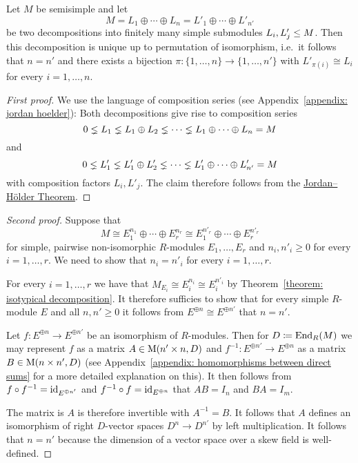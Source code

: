 \begin{lemma}
  \label{lemma: multiplicities for finite length}
  Let $M$ be semisimple and let
  \[
      M
    = L_1 \oplus \dotsb \oplus L_n
    = L'_1 \oplus \dotsb \oplus L'_{n'}
  \]
  be two decompositions into finitely many simple submodules $L_i, L'_j \leq M$.
  Then this decomposition is unique up to permutation of isomorphism, i.e.\ it follows that $n = n'$ and there exists a bijection $\pi \colon \{1, \dotsc, n\} \to \{1, \dotsc, n'\}$ with $L'_{\pi(i)} \cong L_i$ for every $i = 1, \dotsc, n$.
\end{lemma}


\begin{proof}[First proof]
  We use the language of composition series (see Appendix~\ref{appendix: jordan hoelder}):
  Both decompositions give rise to composition series
  \[
                0
    \lneq  L_1
    \lneq  L_1 \oplus L_2
    \lneq  \dotsb
    \lneq  L_1 \oplus \dotsb \oplus L_n
    =           M
  \]
  and
  \[
                0
    \lneq  L'_1
    \lneq  L'_1 \oplus L'_2
    \lneq  \dotsb
    \lneq  L'_1 \oplus \dotsb \oplus L'_{n'}
    =           M
  \]
  with composition factors $L_i, L'_j$.
  The claim therefore follows from the \hyperref[theorem: jordan hoelder theorem]{Jordan--Hölder Theorem}.
\end{proof}


\begin{proof}[Second proof]
  Suppose that
  \[
          M
    \cong E_1^{n_1} \oplus \dotsb \oplus E_r^{n_r}
    \cong E_1^{n'_r} \oplus \dotsb \oplus E_r^{n'_r}
  \]
  for simple, pairwise non-isomorphic $R$-modules $E_1, \dotsc, E_r$ and $n_i, n'_i \geq 0$ for every $i = 1, \dotsc, r$.
  We need to show that $n_i = n'_i$ for every $i = 1, \dotsc, r$.
  
  For every $i = 1, \dotsc, r$ we have that $M_{E_i} \cong E_i^{n_i} \cong E_i^{n'_i}$ by Theorem~\ref{theorem: isotypical decomposition}.
  It therefore sufficies to show that for every simple $R$-module $E$ and all $n, n' \geq 0$ it follows from $E^{\oplus n} \cong E^{\oplus n'}$ that $n = n'$.
  
  Let $f \colon E^{\oplus n} \to E^{\oplus n'}$ be an isomorphism of $R$-modules.
  Then for $D \coloneqq \operatorname{End}_R(M)$ we may represent $f$ as a matrix $A \in \operatorname{M}(n' \times n, D)$ and $f^{-1} \colon E^{\oplus n'} \to E^{\oplus n}$ as a matrix $B \in \operatorname{M}(n \times n', D)$ (see Appendix~\ref{appendix: homomorphisms between direct sums} for a more detailed explanation on this).
  It then follows from $f \circ f^{-1} = \operatorname{id}_{E^{\oplus n'}}$ and $f^{-1} \circ f = \operatorname{id}_{E^{\oplus n}}$ that $AB = I_n$ and $BA = I_m$.
  
  The matrix is $A$ is therefore invertible with $A^{-1} = B$.
  It follows that $A$ defines an isomorphism of right $D$-vector spaces $D^n \to D^{n'}$ by left multiplication.
  It follows that $n = n'$ because the dimension of a vector space over a skew field is well-defined.
\end{proof}


